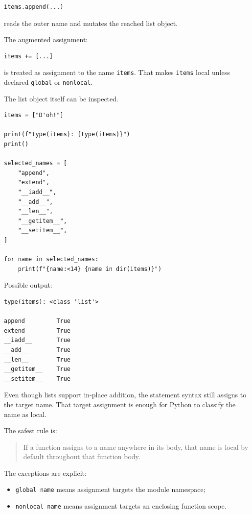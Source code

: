 \begin{verbatim}
items.append(...)
\end{verbatim}

reads the outer name and mutates the reached list object.

The augmented assignment:

\begin{verbatim}
items += [...]
\end{verbatim}

is treated as assignment to the name \texttt{items}. That makes \texttt{items} local unless declared \texttt{global} or \texttt{nonlocal}.

The list object itself can be inspected.

\begin{verbatim}
items = ["D'oh!"]

print(f"type(items): {type(items)}")
print()

selected_names = [
    "append",
    "extend",
    "__iadd__",
    "__add__",
    "__len__",
    "__getitem__",
    "__setitem__",
]

for name in selected_names:
    print(f"{name:<14} {name in dir(items)}")
\end{verbatim}

Possible output:

\begin{verbatim}
type(items): <class 'list'>

append         True
extend         True
__iadd__       True
__add__        True
__len__        True
__getitem__    True
__setitem__    True
\end{verbatim}

Even though lists support in-place addition, the statement syntax still assigns to the target name. That target assignment is enough for Python to classify the name as local.

The safest rule is:

\begin{quote}
If a function assigns to a name anywhere in its body, that name is local by default throughout that function body.
\end{quote}

The exceptions are explicit:

\begin{itemize}
    \item \texttt{global name} means assignment targets the module namespace;
    \item \texttt{nonlocal name} means assignment targets an enclosing function scope.
\end{itemize}

